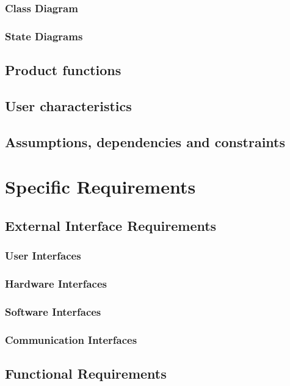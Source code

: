 \documentclass{Configuration_Files/PoliMi3i_thesis}
\begin{document}
\subsection{Class Diagram}

\subsection{State Diagrams}

\section{Product functions}

\section{User characteristics}

\section{Assumptions, dependencies and constraints}

\chapter{Specific Requirements}

\section{External Interface Requirements}

\subsection{User Interfaces}

\subsection{Hardware Interfaces}

\subsection{Software Interfaces}

\subsection{Communication Interfaces}

\section{Functional Requirements}
\end{document}
